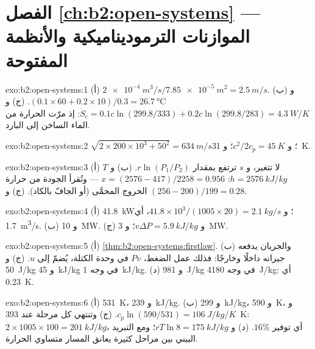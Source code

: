 \section*{الفصل \ref{ch:b2:open-systems} --- الموازنات الترموديناميكية والأنظمة المفتوحة}

\begin{solution}{exo:b2:open-systems:1}
(أ) $\qty{2e-4}{m^3/s}/\qty{7.85e-5}{m^2} = \qty{2.5}{m/s}$. (ب) و $(0.1 \times 60 + 0.2
\times 10)/0.3 = \qty{26.7}{\celsius}$. (ج) و $\dot S_{\text{c}} = 0.1c\ln(299.8/333) +
0.2c\ln(299.8/283) = \qty{4.3}{W/K}$: إذ مرّت الحرارة من الماء الساخن إلى البارد.
\end{solution}

\begin{solution}{exo:b2:open-systems:2}
$\sqrt{2 \times 200 \times 10^3 + 50^2} = \qty{634}{m/s}$؛ و $c^2/2c_p = \qty{45}{K}$؛
و \qty{31}{K}.
\end{solution}

\begin{solution}{exo:b2:open-systems:3}
(أ) $T$ لا تتغير، و $s$ ترتفع بمقدار $r\ln(P_1/P_2)$. (ب) و $h = \qty{2576}{kJ/kg}$:
$x = (2576 - 417)/2258 = 0.956$ --- وتُقرأ الجودة من
حرارة الخروج المحمَّى (أو الجافّ بالكاد). (ج) و $(256 -
200)/199 = 0.28$.
\end{solution}

\begin{solution}{exo:b2:open-systems:4}
(أ) \qty{41.8}{kW}؛ و $41.8 \times 10^3/(1005 \times 20) = \qty{2.1}{kg/s}$، أي \qty{1.7}{m^3/s}.
(ب) و \qty{10}{MW}. (ج) و $v\Delta P = \qty{5.9}{kJ/kg}$؛ و \qty{3}{MW}.
\end{solution}

\begin{solution}{exo:b2:open-systems:5}
(أ) \cref{thm:b2:open-systems:firstlaw}. (ب) والجريان يدفعه جيرانه
داخلًا وخارجًا: فذلك عمل الضغط، $Pv$ في وحدة الكتلة، يُضمّ
إلى $u$. (ج) و \qty{50}{J/kg} و \qty{45}{kJ/kg} في وجه \qty{1}{kJ/kg}.
(د) و \qty{981}{J/kg} في وجه \qty{4180}{J/kg}: أي \qty{0.23}{K}.
\end{solution}

\begin{solution}{exo:b2:open-systems:6}
(أ) \qty{531}{K}، و \qty{239}{kJ/kg}. (ب) و \qty{299}{kJ/kg}، و \qty{590}{K}، و $c_p\ln(590/531)
= \qty{106}{J/kg/K}$. (ج) وتنتهي كل مرحلة عند \qty{393}{K}: $2 \times 1005 \times 100 =
\qty{201}{kJ/kg}$، أي توفير $16\%$. (د) و $rT\ln 8 = \qty{175}{kJ/kg}$؛ ومع
التبريد البيني بين مراحل كثيرة يعانق المسار متساوي الحرارة.
\end{solution}

